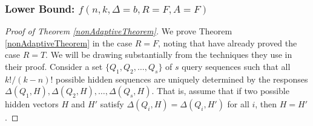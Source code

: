 \documentclass[12pt, a4paper]{article}
\begin{document}
\subsubsection{Lower Bound: $f(n, k, \Delta=b, R=F, A=F)$}


\begin{proof}[Proof of Theorem \ref{nonAdaptiveTheorem}]
	We prove Theorem \ref{nonAdaptiveTheorem} in the case $R = F$, noting that \cite{DS13} have already proved the case $R=T$. We will be drawing substantially from the techniques they use in their proof. Consider a set $\{Q_1, Q_2, \ldots, Q_s\}$ of $s$ query sequences such that all $k!/(k-n)!$ possible hidden sequences are uniquely determined by the responses $\Delta(Q_1, H), \Delta(Q_2, H), \ldots, \Delta(Q_s, H)$. That is, assume that if two possible hidden vectors $H$ and $H'$ satisfy $\Delta(Q_i, H) = \Delta(Q_i, H')$ for all $i$, then $H = H'$.


\end{proof}
\end{document}
